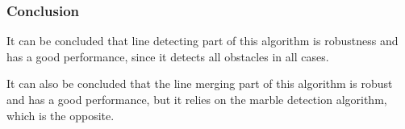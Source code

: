 \documentclass[../Head/Main.tex]{subfiles}
\begin{document}
\subsubsection*{Conclusion}
It can be concluded that line detecting part of this algorithm is robustness and has a good performance, since it detects all obstacles in all cases. \par
It can also be concluded that the line merging part of this algorithm is robust and has a good performance, but it relies on the marble detection algorithm, which is the opposite.
\end{document}
